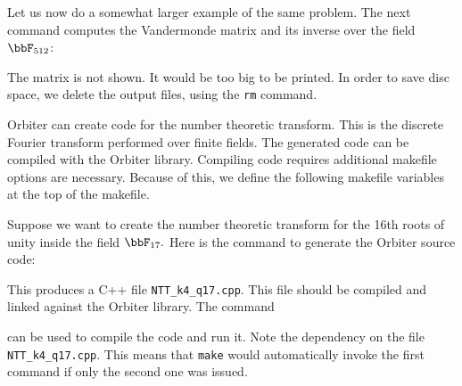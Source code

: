 
\bigskip


Let us now do a somewhat larger example of the same problem. 
The next command computes the Vandermonde matrix and its inverse over the field 
$\bbF_{512}$:


The matrix is not shown. It would be too big to be printed.
In order to save disc space, 
we delete the output files, using the \verb'rm' command.

\bigskip






Orbiter can create code for the number theoretic transform. 
This is the discrete Fourier transform performed over finite fields.
The generated code can be compiled with the Orbiter library. 
Compiling code requires additional makefile options are necessary. 
Because of this, we define the following makefile variables 
at the top of the makefile.



\bigskip

Suppose we want to create 
the number theoretic transform for the 16th 
roots of unity inside the field $\bbF_{17}.$ 
Here is the command to generate the Orbiter source code:


This produces a C++ file \verb'NTT_k4_q17.cpp'. 
This file should be compiled and linked against the Orbiter library. 
The command 


can be used to compile the code and run it. 
Note the dependency on the file \verb'NTT_k4_q17.cpp'. 
This means that \verb'make' would automatically 
invoke the first command if only the second one was issued.



\bigskip







